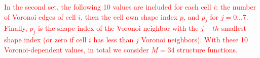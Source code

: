 \documentclass[twoside,twocolumn,9pt]{article}
\begin{document}
\textcolor{red}{
In the second set, the following 10 values are included for each cell $i$: the number of Voronoi edges of cell $i$, then the cell own shape index $p$, and $p_j$ for $j=0...7$.
Finally, $p_j$ is the shape index of the Voronoi neighbor with the $j-th$ smallest shape index (or zero if cell $i$ has less than $j$ Voronoi neighbors).
With these 10 Voronoi-dependent values, in total we consider $M=34$ structure functions. }
\end{document}
